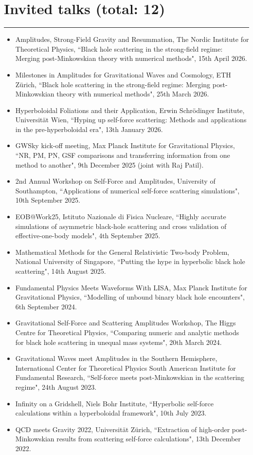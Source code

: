 \documentclass[10.5pt, oneside]{article}   	%
\begin{document}
  {\color{Sectioncolour}
\section*{Invited talks {\rm (total: 12)}}
\vspace{-3mm}
\noindent\rule{\linewidth}{0.6pt}}
\begin{itemize}
\item Amplitudes, Strong-Field Gravity and Resummation, The Nordic Institute for Theoretical Physics, ``Black hole scattering in the strong-field regime: Merging post-Minkowskian theory with numerical methods", 15th April 2026.
\item Milestones in Amplitudes for Gravitational Waves and Cosmology, ETH Zürich, ``Black hole scattering in the strong-field regime: Merging post-Minkowskian theory with numerical methods", 25th March 2026.
\item Hyperboloidal Foliations and their Application, Erwin Schrödinger Institute, Universität Wien, ``Hyping up self-force scattering: Methods and applications in the pre-hyperboloidal era", 13th January 2026.
\item GWSky kick-off meeting, Max Planck Institute for Gravitational Physics, ``NR, PM, PN, GSF comparisons and transferring information from one method to another", 9th December 2025 (joint with Raj Patil).
\item 2nd Annual Workshop on Self-Force and Amplitudes, University of Southampton, ``Applications of numerical self-force scattering simulations", 10th September 2025.
\item EOB@Work25, Istituto Nazionale di Fisica Nucleare, ``Highly accurate simulations of asymmetric black-hole scattering and cross validation of effective-one-body models", 4th September 2025.
\item Mathematical Methods for the General Relativistic Two-body Problem, National University of Singapore, ``Putting the hype in hyperbolic black hole scattering", 14th August 2025.
\item Fundamental Physics Meets Waveforms With LISA, Max Planck Institute for Gravitational Physics, ``Modelling of unbound binary black hole encounters", 6th September 2024.
\item Gravitational Self-Force and Scattering Amplitudes Workshop, The Higgs Centre for Theoretical Physics, ``Comparing numeric and analytic methods for black hole scattering in unequal mass systems", 20th March 2024.
\item Gravitational Waves meet Amplitudes in the Southern Hemisphere, International Center for Theoretical Physics South American Institute for Fundamental Research, ``Self-force meets post-Minkowskian in the scattering regime", 24th August 2023.
\item Infinity on a Gridshell, Niels Bohr Institute, ``Hyperbolic self-force calculations within a hyperboloidal framework", 10th July 2023.
\item QCD meets Gravity 2022, Universität Zürich, ``Extraction of high-order post-Minkowskian results from scattering self-force calculations", 13th December 2022.
\end{itemize} 
\end{document}
